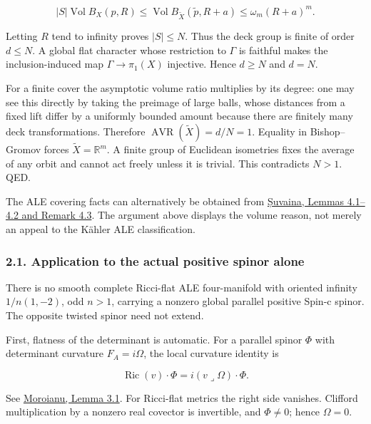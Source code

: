 \documentclass[
  10pt,
]{article}
\begin{document}
\[
 |S|\operatorname{Vol}B_X(p,R)
     \le\operatorname{Vol}B_{\widetilde X}(\tilde p,R+a)
     \le\omega_m(R+a)^m.
\]

Letting \(R\) tend to infinity proves \(|S|\le N\). Thus the deck group
is finite of order \(d\le N\). A global flat character whose restriction
to \(\Gamma\) is faithful makes the inclusion-induced map
\(\Gamma\to\pi_1(X)\) injective. Hence \(d\ge N\) and \(d=N\).

For a finite cover the asymptotic volume ratio multiplies by its degree:
one may see this directly by taking the preimage of large balls, whose
distances from a fixed lift differ by a uniformly bounded amount because
there are finitely many deck transformations. Therefore
\(\operatorname{AVR}(\widetilde X)=d/N=1\). Equality in Bishop--Gromov
forces \(\widetilde X=\mathbb R^m\). A finite group of Euclidean
isometries fixes the average of any orbit and cannot act freely unless
it is trivial. This contradicts \(N>1\). QED.

The ALE covering facts can alternatively be obtained from
\href{https://arxiv.org/pdf/1102.2672}{Șuvaina, Lemmas 4.1--4.2 and
Remark 4.3}. The argument above displays the volume reason, not merely
an appeal to the Kähler ALE classification.

\hypertarget{application-to-the-actual-positive-spinor-alone}{%
\subsubsection{2.1. Application to the actual positive spinor
alone}\label{application-to-the-actual-positive-spinor-alone}}

There is no smooth complete Ricci-flat ALE four-manifold with oriented
infinity \(1/n(1,-2)\), odd \(n>1\), carrying a nonzero global parallel
positive Spin-c spinor. The opposite twisted spinor need not extend.

First, flatness of the determinant is automatic. For a parallel spinor
\(\Phi\) with determinant curvature \(F_A=i\Omega\), the local curvature
identity is

\[
 \operatorname{Ric}(v)\cdot\Phi
                      =i(v\mathbin{\lrcorner}\Omega)\cdot\Phi.
                                                        \tag{2.1}
\]

See \href{https://moroianu.perso.math.cnrs.fr/tex/1997cmp.pdf}{Moroianu,
Lemma 3.1}. For Ricci-flat metrics the right side vanishes. Clifford
multiplication by a nonzero real covector is invertible, and
\(\Phi\ne0\); hence \(\Omega=0\).
\end{document}
